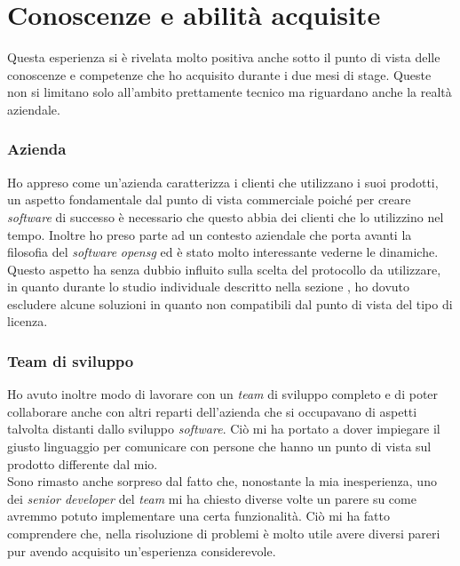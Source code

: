 \newpage

\section{Conoscenze e abilità acquisite}
Questa esperienza si è rivelata molto positiva anche sotto il punto di vista delle conoscenze e competenze che ho acquisito durante i due mesi di stage.
Queste non si limitano solo all'ambito prettamente tecnico ma riguardano anche la realtà aziendale. 
\subsubsection{Azienda}
Ho appreso come un'azienda caratterizza i clienti che utilizzano i suoi prodotti, un aspetto fondamentale dal punto di vista commerciale poiché per creare \textit{software} di successo è necessario che questo abbia dei clienti che lo utilizzino nel tempo. Inoltre ho preso parte ad un contesto aziendale che porta avanti la filosofia del \textit{software} \textit{\gls{opensg}} ed è stato molto interessante vederne le dinamiche. \\
Questo aspetto ha senza dubbio influito sulla scelta del protocollo da utilizzare, in quanto durante lo studio individuale descritto nella sezione , ho dovuto escludere alcune soluzioni in quanto non compatibili dal punto di vista del tipo di licenza.

\subsubsection{Team di sviluppo}
Ho avuto inoltre modo di lavorare con un \textit{team} di sviluppo completo e di poter collaborare anche con altri reparti dell'azienda che si occupavano di aspetti talvolta distanti dallo sviluppo \textit{software}. Ciò mi ha portato a dover impiegare il giusto linguaggio per comunicare con persone che hanno un punto di vista sul prodotto differente dal mio. \\
Sono rimasto anche sorpreso dal fatto che, nonostante la mia inesperienza, uno dei \textit{senior developer} del \textit{team} mi ha chiesto diverse volte un parere su come avremmo potuto implementare una certa funzionalità. Ciò mi ha fatto comprendere che, nella risoluzione di problemi è molto utile avere diversi pareri pur avendo acquisito un'esperienza considerevole.

